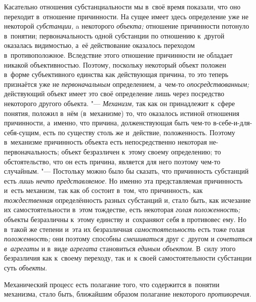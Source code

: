 Касательно отношения субстанциальности мы в~своё время
показали, что оно переходит в~отношение причинности. На сущее имеет здесь
определение уже не некоторой {\em субстанции,} a некоторого {\em объекта;}
отношение причинности потонуло в~понятии; первоначальность
одной субстанции по отношению к~другой оказалась видимостью, а~её
действование оказалось переходом в~противоположное. Вследствие этого
отношение причинности не обладает никакой объективностью. Поэтому,
поскольку некоторый объект положен в~форме субъективного единства как
действующая причина, то это теперь признаётся уже не {\em первоначальным}
определением, а~чем-то {\em опосредствованным;}
действующий объект имеет это своё определение лишь через
посредство некоторого другого объекта. "--- {\em Механизм,} так как он
принадлежит к~сфере понятия, положил в~нём (в~механизме) то, что оказалось
истиной отношения причинности, а~именно, что причина, долженствующая быть
чем-то в-себе-и-для-себя-сущим, есть по существу столь же и~действие,
положенность. Поэтому в~механизме причинность объекта есть непосредственно
некоторая не-первоначальность; объект безразличен к~этому своему
определению; то обстоятельство, что он есть причина, является для него
поэтому чем-то случайным. "--- Постольку можно было бы сказать,
что причинность субстанций есть {\em лишь нечто представляемое}.
Но именно эта представляемая причинность и~есть механизм, так
как об состоит в~том, что причинность, как {\em тождественная}
определённость разных субстанций и, стало быть, как исчезание
их самостоятельности в~этом тождестве, есть некоторая {\em голая положенность;}
объекты безразличны к~этому единству и~сохраняют себя в
противовес ему. Но в~такой же степени и~эта их безразличная
{\em самостоятельность} есть тоже голая {\em положенность;} они
поэтому способны {\em смешиваться} друг с~другом и {\em сочетаться в~агрегаты}
и в~виде {\em агрегата} становиться {\em единым
объектом}. В~силу этого безразличия как к~своему переходу,
так и~к своей самостоятельности субстанции суть {\em объекты}.


Механический процесс есть полагание того, что содержится в~понятии механизма,
стало быть, ближайшим образом полагание некоторого {\em противоречия}.

